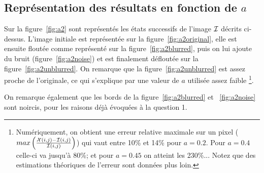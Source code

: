 \subsection{Représentation des résultats en fonction de $a$}
Sur la figure~\ref{fig:a2} sont représentés les états successifs de l'image $\mathcal{I}$ décrits ci-dessus. L'image initiale est représentée sur la figure~\ref{fig:a2original}, elle est ensuite floutée comme représenté sur la figure~\ref{fig:a2blurred}, puis on lui ajoute du bruit (figure~\ref{fig:a2noise}) et est finalement défloutée sur la figure~\ref{fig:a2unblurred}.
On remarque que la figure~\ref{fig:a2unblurred} est assez proche de l'originale, ce qui s'explique par une valeur de $a$ utilisée assez faible \footnote{Numériquement, on obtient une erreur relative maximale sur un pixel ($max\left( \frac{\mathcal{X} (i,j) - \mathcal{I}(i,j)}{\mathcal{I} (i,j)} \right)$) qui vaut entre 10\% et 14\% pour $a=0.2$. Pour $a=0.4$ celle-ci va jusqu'à 80\%; et pour $a=0.45$ on atteint les 230\%... Notez que des estimations théoriques de l'erreur sont données plus loin.}.

On remarque également que les bords de la figure~\ref{fig:a2blurred} et ~\ref{fig:a2noise} sont noircis, pour les raisons déjà évoquées à la question 1.

